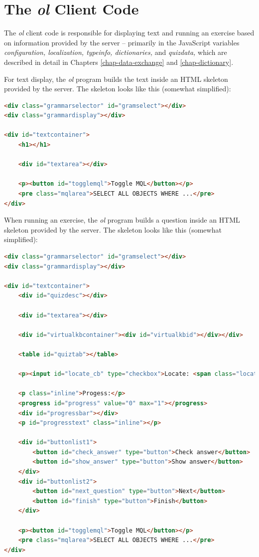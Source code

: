 \documentclass[11pt,oneside,a4paper]{memoir}
\begin{document}
\section{The \emph{ol} Client Code}\label{sec-ol}

The \emph{ol} client code is responsible for displaying text and running an exercise based on
information provided by the server -- primarily in the JavaScript variables \emph{configuration,
  localization, typeinfo, dictionaries,} and \emph{quizdata,} which are described in detail in
Chapters \ref{chap-data-exchange} and \ref{chap-dictionary}.

For text display, the \emph{ol} program builds the text inside an HTML skeleton provided by the
server. The skeleton looks like this (somewhat simplified):


\begin{lstlisting}[language=HTML]
<div class="grammarselector" id="gramselect"></div>
<div class="grammardisplay"></div>
 
<div id="textcontainer">
    <h1></h1>
   
    <div id="textarea"></div>

    <p><button id="togglemql">Toggle MQL</button></p>
    <pre class="mqlarea">SELECT ALL OBJECTS WHERE ...</pre>
</div>
\end{lstlisting}

When running an exercise, the \emph{ol} program builds a question inside an HTML skeleton provided by the
server. The skeleton looks like this (somewhat simplified):

\begin{lstlisting}[language=HTML,morekeywords={progress}]
<div class="grammarselector" id="gramselect"></div>
<div class="grammardisplay"></div>
 
<div id="textcontainer">
    <div id="quizdesc"></div>
   
    <div id="textarea"></div>
 
    <div id="virtualkbcontainer"><div id="virtualkbid"></div></div>
  
    <table id="quiztab"></table>
  
    <p><input id="locate_cb" type="checkbox">Locate: <span class="location"></span></p>

    <p class="inline">Progess:</p>
    <progress id="progress" value="0" max="1"></progress>
    <div id="progressbar"></div>
    <p id="progresstext" class="inline"></p>

    <div id="buttonlist1">
        <button id="check_answer" type="button">Check answer</button>
        <button id="show_answer" type="button">Show answer</button>
    </div>
    <div id="buttonlist2">
        <button id="next_question" type="button">Next</button>
        <button id="finish" type="button">Finish</button>
    </div>

    <p><button id="togglemql">Toggle MQL</button></p>
    <pre class="mqlarea">SELECT ALL OBJECTS WHERE ...</pre>
</div>
\end{lstlisting}
  
\end{document}
